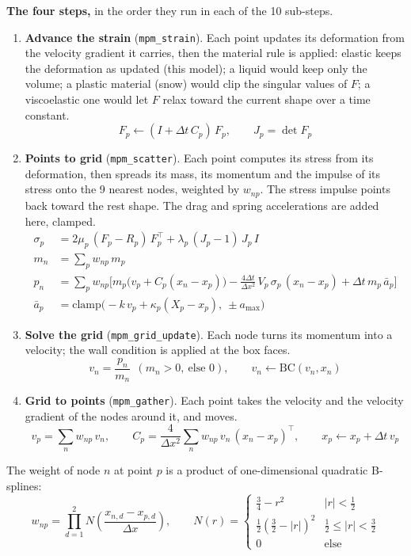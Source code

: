 \documentclass[10pt]{article}
\newcommand{\code}[1]{\texttt{#1}}
\begin{document}
\textbf{The four steps,} in the order they run in each of the 10 sub-steps.
\begin{enumerate}[leftmargin=1.6em,itemsep=4pt]
\item \textbf{Advance the strain} (\code{mpm\_strain}). Each point updates its deformation from the velocity
gradient it carries, then the material rule is applied: elastic keeps the deformation as updated (this model); a
liquid would keep only the volume; a plastic material (snow) would clip the singular values of $F$; a
viscoelastic one would let $F$ relax toward the current shape over a time constant.
\[ F_p \leftarrow (I + \Delta t\, C_p)\, F_p, \qquad J_p = \det F_p \]
\item \textbf{Points to grid} (\code{mpm\_scatter}). Each point computes its stress from its deformation, then
spreads its mass, its momentum and the impulse of its stress onto the 9 nearest nodes, weighted by $w_{np}$. The
stress impulse points back toward the rest shape. The drag and spring accelerations are added here, clamped.
\begin{align*}
\sigma_p &= 2\mu_p\,(F_p - R_p)\,F_p^{\!\top} + \lambda_p\,(J_p - 1)\,J_p\, I \\
m_n &= \sum_p w_{np}\, m_p \\
p_n &= \sum_p w_{np}\Big[ m_p\big(v_p + C_p (x_n - x_p)\big) - \frac{4\Delta t}{\Delta x^2}\, V_p\, \sigma_p\,(x_n - x_p) + \Delta t\, m_p\, \bar a_p \Big] \\
\bar a_p &= \mathrm{clamp}\big(-k\, v_p + \kappa_p (X_p - x_p),\ \pm a_{\max}\big)
\end{align*}
\item \textbf{Solve the grid} (\code{mpm\_grid\_update}). Each node turns its momentum into a velocity; the wall
condition is applied at the box faces.
\[ v_n = \frac{p_n}{m_n}\ \ (m_n > 0,\ \text{else } 0), \qquad v_n \leftarrow \mathrm{BC}(v_n, x_n) \]
\item \textbf{Grid to points} (\code{mpm\_gather}). Each point takes the velocity and the velocity gradient of the
nodes around it, and moves.
\[ v_p = \sum_n w_{np}\, v_n, \qquad C_p = \frac{4}{\Delta x^2}\sum_n w_{np}\, v_n\,(x_n - x_p)^{\!\top}, \qquad x_p \leftarrow x_p + \Delta t\, v_p \]
\end{enumerate}
The weight of node $n$ at point $p$ is a product of one-dimensional quadratic B-splines:
\[ w_{np} = \prod_{d=1}^{2} N\!\left(\frac{x_{n,d} - x_{p,d}}{\Delta x}\right), \qquad
   N(r) = \begin{cases} \tfrac34 - r^2 & |r| < \tfrac12 \\ \tfrac12\left(\tfrac32 - |r|\right)^2 & \tfrac12 \le |r| < \tfrac32 \\ 0 & \text{else}\end{cases} \]
\end{document}
